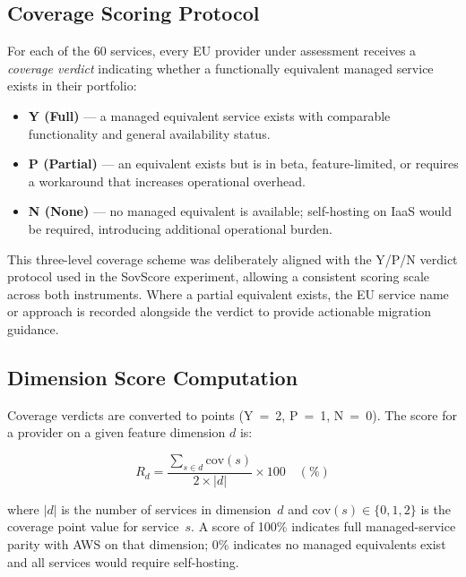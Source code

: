 \subsection{Coverage Scoring Protocol}
\label{subsec:coverage_scoring}

For each of the 60 services, every EU provider under assessment receives a \textit{coverage verdict} indicating whether a functionally equivalent managed service exists in their portfolio:

\begin{itemize}
  \item \textbf{Y (Full)} — a managed equivalent service exists with comparable functionality and general availability status.
  \item \textbf{P (Partial)} — an equivalent exists but is in beta, feature-limited, or requires a workaround that increases operational overhead.
  \item \textbf{N (None)} — no managed equivalent is available; self-hosting on IaaS would be required, introducing additional operational burden.
\end{itemize}

This three-level coverage scheme was deliberately aligned with the Y/P/N verdict protocol used in the SovScore experiment, allowing a consistent scoring scale across both instruments. Where a partial equivalent exists, the EU service name or approach is recorded alongside the verdict to provide actionable migration guidance.

\subsection{Dimension Score Computation}
\label{subsec:dimension_score}

Coverage verdicts are converted to points (Y~=~2, P~=~1, N~=~0). The score for a provider on a given feature dimension $d$ is:

\begin{equation}
  R_d = \frac{\displaystyle\sum_{s \in d} \text{cov}(s)}{2 \times |d|} \times 100 \quad (\%)
  \label{eq:readiness_dim}
\end{equation}

where $|d|$ is the number of services in dimension~$d$ and $\text{cov}(s) \in \{0, 1, 2\}$ is the coverage point value for service~$s$. A score of 100\% indicates full managed-service parity with AWS on that dimension; 0\% indicates no managed equivalents exist and all services would require self-hosting.

